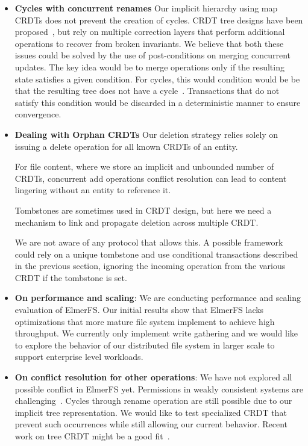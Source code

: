 \documentclass[sigconf, 10pt]{acmart}
\begin{document}
\begin{itemize}
    \item \textbf{Cycles with concurrent renames}
    Our implicit hierarchy using map CRDTs does not prevent the creation of cycles.
    CRDT tree designs have been proposed~\cite{martin2012abstract}\cite{ahmed2012file}, but rely on multiple correction
    layers that perform additional operations to recover from broken invariants.
    We believe that both these issues could be solved by the use of post-conditions on merging
    concurrent updates.
    The key idea would be to merge operations only if the resulting state satisfies a given condition.
    For cycles, this would condition would be be that the resulting tree does not have a cycle~\cite{nair:hal-03150817}.
    Transactions that do not satisfy this condition would be discarded in a deterministic manner to ensure convergence.

    \item \textbf{Dealing with Orphan CRDTs}
    Our deletion strategy relies solely on issuing a delete operation for all
    known CRDTs of an entity.

    For file content, where we store an implicit and unbounded number of CRDTs,
    concurrent add operations conflict resolution can lead to content lingering
    without an entity to reference it.

    Tombstones are sometimes used in CRDT design, but here we need a mechanism to link and propagate deletion across multiple CRDT.

    We are not aware of any protocol that allows this. A possible framework could rely on a unique tombstone and use conditional
    transactions described in the previous section, ignoring the incoming operation from the various CRDT if the tombstone is set.

    \item \textbf{On performance and scaling}: We are conducting performance and scaling evaluation of ElmerFS.
    Our initial results show that ElmerFS lacks optimizations that more mature file system implement to achieve high throughput.
    We currently only implement write gathering and we would like to explore the behavior of our distributed file system in larger scale to support enterprise level workloads.

    \item \textbf{On conflict resolution for other operations}: We have not explored all possible conflict in ElmerFS yet.
    Permissions in weakly consistent systems are challenging~\cite{yanakieva2021access}.
    Cycles through rename operation are still possible due to our implicit tree representation.
    We would like to test specialized CRDT that prevent such occurrences while still allowing our current behavior. Recent work on tree CRDT might be a good fit~\cite{nair:hal-03150817}.
\end{itemize}
\end{document}
